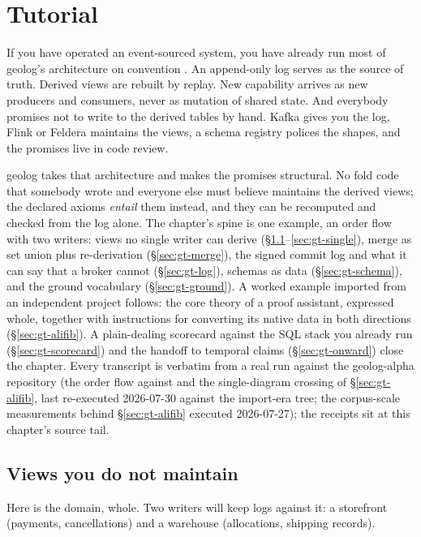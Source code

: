 \chapter{Tutorial}
\label{ch:geolog-tutorial}

\noindent\draftmark\medskip

If you have operated an event-sourced system, you have already run
most of geolog's architecture on convention \cite{kleppmann21}. An
append-only log serves as the source of truth. Derived views are
rebuilt by replay. New capability arrives as new producers and
consumers, never as mutation of shared state. And everybody promises
not to write to the derived tables by hand. Kafka gives you the log,
Flink or Feldera maintains the views, a schema registry polices the
shapes, and the promises live in code review.

geolog takes that architecture and makes the promises structural. No
fold code that somebody wrote and everyone else must believe maintains
the derived views; the declared axioms \emph{entail} them instead, and
they can be recomputed and checked from the log alone. The chapter's
spine is one example, an order flow with two writers: views no single
writer can derive (\S\ref{sec:gt-views}--\ref{sec:gt-single}), merge
as set union plus re-derivation (\S\ref{sec:gt-merge}), the signed
commit log and what it can say that a broker cannot
(\S\ref{sec:gt-log}), schemas as data (\S\ref{sec:gt-schema}), and the
ground vocabulary (\S\ref{sec:gt-ground}). A worked example imported
from an independent project follows: the core theory of a proof
assistant, expressed whole, together with instructions for converting
its native data in both directions (\S\ref{sec:gt-alifib}). A
plain-dealing scorecard against the SQL stack you already run
(\S\ref{sec:gt-scorecard}) and the handoff to temporal claims
(\S\ref{sec:gt-onward}) close the chapter. Every transcript is
verbatim from a real run against the geolog-alpha repository (the
order flow against  and the
single-diagram crossing of \S\ref{sec:gt-alifib}, last re-executed
2026-07-30 against the import-era tree; the corpus-scale
measurements behind \S\ref{sec:gt-alifib} executed 2026-07-27); the
receipts sit at this chapter's source tail.

\section{Views you do not maintain}
\label{sec:gt-views}

Here is the domain, whole. Two writers will keep logs against it: a
storefront (payments, cancellations) and a warehouse (allocations,
shipping records).

